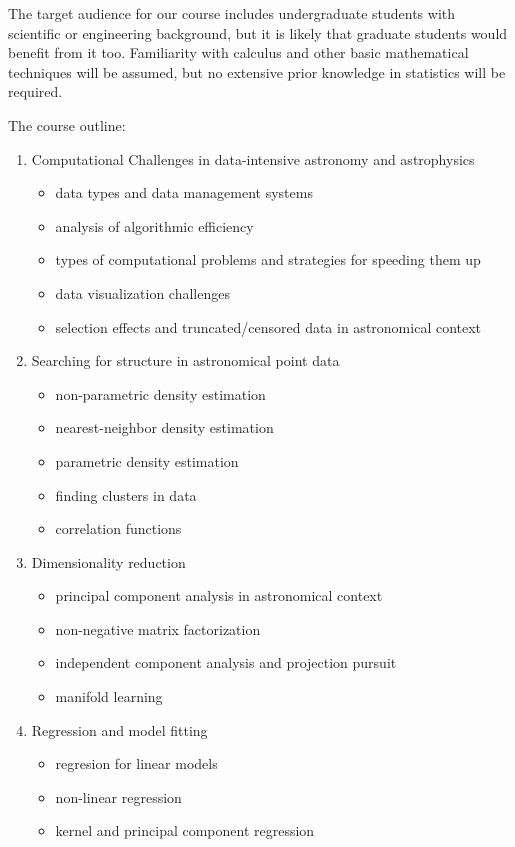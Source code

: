 The target audience for our course includes undergraduate students with scientific 
or engineering background, but it is likely that graduate students
would benefit from it too. Familiarity with calculus and other basic mathematical 
techniques will be assumed, but no extensive prior knowledge in statistics will be 
required. 

The course outline: 

\begin{enumerate} 
\item Computational Challenges in data-intensive astronomy and astrophysics
\begin{itemize}
\item  data types and data management systems 
\item  analysis of algorithmic efficiency
\item  types of computational problems and strategies for speeding them up 
\item  data visualization challenges
\item  selection effects and truncated/censored data in astronomical context 
\end{itemize}
\item Searching for structure in astronomical point data
\begin{itemize}
\item  non-parametric density estimation
\item  nearest-neighbor density estimation
\item  parametric density estimation
\item  finding clusters in data 
\item  correlation functions 
\end{itemize} 
\item Dimensionality reduction
\begin{itemize}
\item  principal component analysis in astronomical context
\item  non-negative matrix factorization 
\item  independent component analysis and projection pursuit 
\item  manifold learning
\end{itemize} 
\item Regression and model fitting
\begin{itemize}
\item  regresion for linear models
\item  non-linear regression
\item  kernel and principal component regression

\end{itemize}
\end{enumerate}
